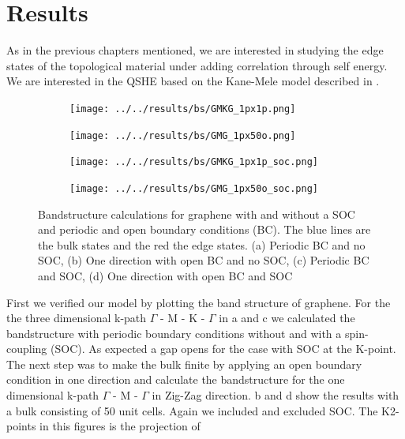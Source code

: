 \documentclass[a4paper,11pt]{report}
\begin{document}
\chapter{Results}\label{s:results}

As in the previous chapters mentioned, we are interested in studying the edge states of the topological material under adding correlation through
self energy. We are interested in the QSHE based on the Kane-Mele model described in .
\begin{figure}[H]
\centering
\begin{subfigure}{.49\textwidth}
  \centering
  \texttt{[image: ../../results/bs/GMKG\_1px1p.png]}
  \label{fig:GMKG-1px1p}
  \caption{}
\end{subfigure}
\begin{subfigure}{.49\textwidth}
  \raggedleft
  \texttt{[image: ../../results/bs/GMG\_1px50o.png]}
  \label{fig:GMG-1px50o}
  \caption{}
\end{subfigure}
\begin{subfigure}{.49\textwidth}
  \centering
  \texttt{[image: ../../results/bs/GMKG\_1px1p\_soc.png]}
  \label{fig:GMKG-1px1p-soc}
  \caption{}
\end{subfigure}
\begin{subfigure}{.49\textwidth}
  \raggedleft
  \texttt{[image: ../../results/bs/GMG\_1px50o\_soc.png]}
  \label{fig:GMG-1px50o-soc}
  \caption{}
\end{subfigure}
\caption[]{Bandstructure calculations for graphene with and without a SOC and periodic and open boundary conditions (BC). The blue lines are the bulk
 states and the red the edge states. (a) Periodic BC and no SOC,
 (b) One direction with open BC and no SOC, (c) Periodic BC and SOC, (d) One direction with open BC and SOC}
\label{fig:bs}
\end{figure}
First we verified our model by plotting the band structure of graphene. For the the three dimensional k-path $\Gamma$ - M - K - $\Gamma$ in
a and c we calculated the bandstructure with periodic boundary conditions without and with a spin-coupling (SOC).
As expected a gap opens for the case with SOC at the K-point.
The next step was to make the bulk finite by applying an open boundary
condition in one direction and calculate the bandstructure for the one dimensional k-path $\Gamma$ - M - $\Gamma$ in Zig-Zag direction. b 
and d show the results with a bulk consisting of 50 unit cells. Again we included and excluded SOC. The K2-points in this figures is the projection of
\end{document}
